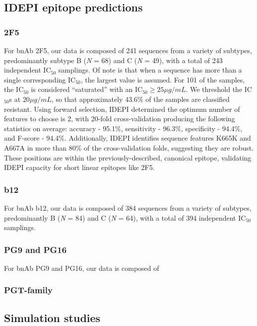 \documentclass[10pt]{article}
\newcommand{\hmic}{{IC}$_{50}$}
\newcommand{\idepi}{{IDEPI}}
\newcommand{\N}{\emph{N}}
\begin{document}
\subsection*{\idepi{} epitope predictions}

\subsubsection*{2F5}
For bnAb 2F5, our data is composed of 241 sequences from a variety of subtypes,
predominantly subtype B (\N{} = 68) and C (\N{} = 49),
with a total of 243 independent \hmic{} samplings.
Of note is that when a sequence has more than a single corresponding \hmic{},
the largest value is assumed.
For 101 of the samples, the \hmic{} is considered ``saturated'' with an $\textrm{{IC}}_{50} \ge 25{\mu}g/mL$.
We threshold the \hmic{}s at $20{\mu}g/mL$,
so that approximately 43.6\% of the samples are classified resistant.
Using forward selection, \idepi{} determined the optimum number of features to choose is 2,
with 20-fold cross-validation producing the following statistics on average:
accuracy - 95.1\%,
sensitivity - 96.3\%,
specificity - 94.4\%,
and F-score - 94.4\%.
Additionally, \idepi{} identifies sequence features K665K and A667A in more than 80\% of the cross-validation folds,
suggesting they are robust.
These positions are within the previously-described, canonical epitope,
validating \idepi{} capacity for short linear epitopes like 2F5.

\subsubsection*{b12}
For bnAb b12, our data is composed of 384 sequences from a variety of subtypes,
predominantly B (\N{} = 84) and C (\N{} = 64),
with a total of 394 independent \hmic{} samplings.

\subsubsection*{PG9 and PG16}
For bnAb PG9 and PG16, our data is composed of 

\subsubsection*{PGT-family}



\subsection*{Simulation studies}
\end{document}
